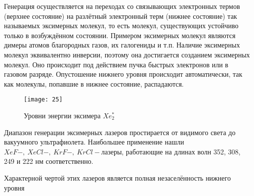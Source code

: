 Генерация осуществляется на переходах со связывающих электронных термов 
(верхнее состояние) на разлётный электронный терм (нижнее состояние) так 
называемых эксимерных молекул, то есть молекул, существующих устойчиво только 
в возбуждённом состоянии. Примером эксимерных молекул являются димеры атомов 
благородных газов, их галогениды и т.п. Наличие эксимерных молекул 
эквивалентно инверсии, поэтому она достигается созданием эксимерных молекул. 
Оно происходит под действием пучка быстрых электронов или в газовом разряде. 
Опустошение нижнего уровня происходит автоматически, так как молекулы, 
попавшие в нижнее состояние, распадаются.

\begin{figure}[h]
    \center
    \texttt{[image: 25]}
    \caption{Уровни энергии эксимера \( Xe_2^* \)}
\end{figure}

Диапазон генерации эксимерных лазеров простирается от видимого света до 
вакуумного ультрафиолета. Наибольшее применение нашли 
\( XeF-,\ XeCl-,\ KrF-,\ KrCl- \)лазеры, работающие на длинах волн 352, 
308, 249 и 222 нм соответственно.

Характерной чертой этих лазеров является полная незаселённость нижнего уровня